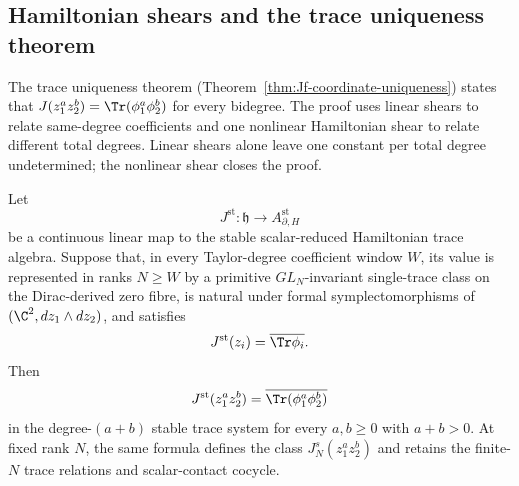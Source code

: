 \subsection{Hamiltonian shears and the trace uniqueness theorem}
\label{ssec:completion-trace-uniqueness}

The trace uniqueness theorem (Theorem~\ref{thm:Jf-coordinate-uniqueness})
states that \(J(z_1^az_2^b)=\Tr(\phi_1^a\phi_2^b)\) for every
bidegree.  The proof uses linear shears to relate same-degree
coefficients and one nonlinear Hamiltonian shear to relate different
total degrees.  Linear shears alone leave one constant per total
degree undetermined; the nonlinear shear closes the proof.

\begin{thm}
\label{thm:completion-shear-determination}
Let
\[
  J^{\mathrm{st}}\colon\mathfrak h\longrightarrow
  A_{\partial,H}^{\mathrm{st}}
\]
be a continuous linear map to the stable scalar-reduced Hamiltonian
trace algebra.  Suppose that, in every Taylor-degree coefficient
window \(W\), its value is represented in ranks \(N\geq W\) by a
primitive \(GL_N\)-invariant single-trace class on the Dirac-derived
zero fibre, is natural under formal symplectomorphisms of
\((\C^2,dz_1\wedge dz_2)\), and satisfies
\[
  J^{\mathrm{st}}(z_i)
  =\overline{\Tr\phi_i}.
\]
Then
\[
  J^{\mathrm{st}}(z_1^az_2^b)
  =\overline{\Tr(\phi_1^a\phi_2^b)}
\]
in the degree-\((a+b)\) stable trace system for every \(a,b\geq0\)
with \(a+b>0\).  At fixed rank \(N\), the same formula defines the
class \(J_N^s(z_1^az_2^b)\) and retains the finite-\(N\) trace
relations and scalar-contact cocycle.
\end{thm}

